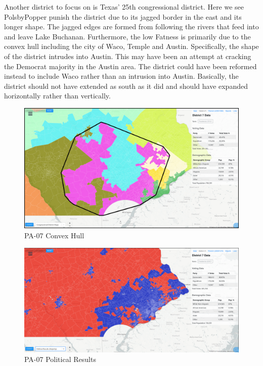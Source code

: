 \documentclass[letterpaper]{article}
\begin{document}
Another district to focus on is Texas' 25th congressional district. Here we see PolsbyPopper punish the district due to its jagged border in the east and its longer shape. The jagged edges are formed from following the rivers that feed into and leave Lake Buchanan. Furthermore, the low Fatness is primarily due to the convex hull including the city of Waco, Temple and Austin. Specifically, the shape of the district intrudes into Austin. This may have been an attempt at cracking the Democrat majority in the Austin area. The district could have been reformed instead to include Waco rather than an intrusion into Austin. Basically, the district should not have extended as south as it did and should have expanded horizontally rather than vertically.

\begin{figure}[H]
	\includegraphics[width=\linewidth]{./figures/PA-07-ConvexHull.png}
	\caption{PA-07 Convex Hull}
	\label{fig:pa07ch}
\end{figure}

\begin{figure}[H]
	\includegraphics[width=\linewidth]{./figures/PA-07-PoliticalResults.png}
	\caption{PA-07 Political Results}
	\label{fig:pa07pr}
\end{figure}
\end{document}
